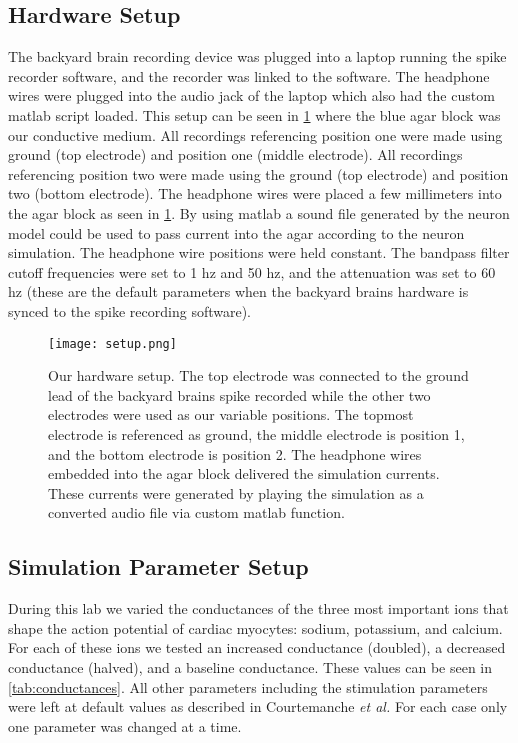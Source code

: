 \documentclass[12pt]{article}
\newcommand{\etal}{{\em et al.}}
\begin{document}
\subsection{Hardware Setup}
\par{}
The backyard brain recording device was plugged into a laptop running the spike recorder software, and the recorder was linked to the software. The headphone wires were plugged into the audio jack of the laptop which also had the custom matlab script loaded. This setup can be seen in \ref{fig:setup} where the blue agar block was our conductive medium. All recordings referencing position one were made using ground (top electrode) and position one (middle electrode). All recordings referencing position two were made using the ground (top electrode) and position two (bottom electrode). The headphone wires were placed a few millimeters into the agar block as seen in \ref{fig:setup}. By using matlab a sound file generated by the neuron model could be used to pass current into the agar according to the neuron simulation. The headphone wire positions were held constant. The bandpass filter cutoff frequencies were set to 1 hz and 50 hz, and the attenuation was set to 60 hz (these are the default parameters when the backyard brains hardware is synced to the spike recording software).


\begin{figure}[H]
	\centering
	\centering
	\texttt{[image: setup.png]}
	
	\caption{Our hardware setup. The top electrode was connected to the ground lead of the backyard brains spike recorded while the other two electrodes were used as our variable positions. The topmost electrode is referenced as ground, the middle electrode is position 1, and the bottom electrode is position 2. The headphone wires embedded into the agar block delivered the simulation currents. These currents were generated by playing the simulation as a converted audio file via custom matlab function. }
	\label{fig:setup}
\end{figure}
\par{}

\subsection{Simulation Parameter Setup}
\par{}
During this lab we varied the conductances of the three most important ions that shape the action potential of cardiac myocytes: sodium, potassium, and calcium. For each of these ions we tested an increased conductance (doubled), a decreased conductance (halved), and a baseline conductance. These values can be seen in \ref{tab:conductances}. All other parameters including the stimulation parameters were left at default values as described in Courtemanche \etal{}\cite{Courtemanche1998} For each case only one parameter was changed at a time.
\end{document}
